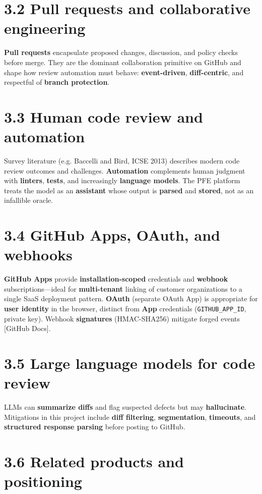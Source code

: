 \documentclass[11pt,a4paper]{report}
\begin{document}
\section{3.2 Pull requests and collaborative engineering}


\textbf{Pull requests} encapsulate proposed changes, discussion, and policy checks before merge. They are the dominant collaboration primitive on GitHub and shape how review automation must behave: \textbf{event-driven}, \textbf{diff-centric}, and respectful of \textbf{branch protection}.


\section{3.3 Human code review and automation}


Survey literature (e.g. Baccelli and Bird, ICSE 2013) describes modern code review outcomes and challenges. \textbf{Automation} complements human judgment with \textbf{linters}, \textbf{tests}, and increasingly \textbf{language models}. The PFE platform treats the model as an \textbf{assistant} whose output is \textbf{parsed} and \textbf{stored}, not as an infallible oracle.


\section{3.4 GitHub Apps, OAuth, and webhooks}


\textbf{GitHub Apps} provide \textbf{installation-scoped} credentials and \textbf{webhook} subscriptions—ideal for \textbf{multi-tenant} linking of customer organizations to a single SaaS deployment pattern. \textbf{OAuth} (separate OAuth App) is appropriate for \textbf{user identity} in the browser, distinct from \textbf{App} credentials (\texttt{GITHUB\_APP\_ID}, private key). Webhook \textbf{signatures} (HMAC-SHA256) mitigate forged events [GitHub Docs].


\section{3.5 Large language models for code review}


LLMs can \textbf{summarize diffs} and flag suspected defects but may \textbf{hallucinate}. Mitigations in this project include \textbf{diff filtering}, \textbf{segmentation}, \textbf{timeouts}, and \textbf{structured response parsing} before posting to GitHub.


\section{3.6 Related products and positioning}
\end{document}
